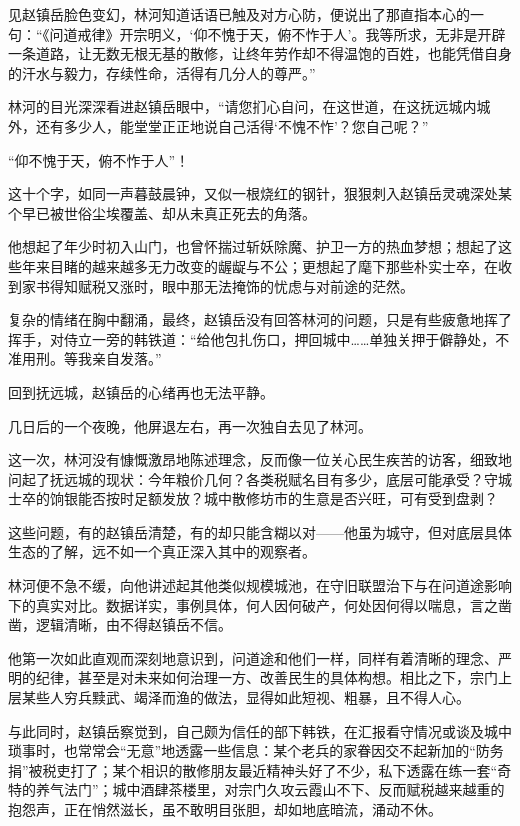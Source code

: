 见赵镇岳脸色变幻，林河知道话语已触及对方心防，便说出了那直指本心的一句：“《问道戒律》开宗明义，‘仰不愧于天，俯不怍于人’。我等所求，无非是开辟一条道路，让无数无根无基的散修，让终年劳作却不得温饱的百姓，也能凭借自身的汗水与毅力，存续性命，活得有几分人的尊严。”

林河的目光深深看进赵镇岳眼中，“请您扪心自问，在这世道，在这抚远城内城外，还有多少人，能堂堂正正地说自己活得‘不愧不怍’？您自己呢？”

“仰不愧于天，俯不怍于人”！

这十个字，如同一声暮鼓晨钟，又似一根烧红的钢针，狠狠刺入赵镇岳灵魂深处某个早已被世俗尘埃覆盖、却从未真正死去的角落。

他想起了年少时初入山门，也曾怀揣过斩妖除魔、护卫一方的热血梦想；想起了这些年来目睹的越来越多无力改变的龌龊与不公；更想起了麾下那些朴实士卒，在收到家书得知赋税又涨时，眼中那无法掩饰的忧虑与对前途的茫然。

复杂的情绪在胸中翻涌，最终，赵镇岳没有回答林河的问题，只是有些疲惫地挥了挥手，对侍立一旁的韩铁道：“给他包扎伤口，押回城中……单独关押于僻静处，不准用刑。等我亲自发落。”

回到抚远城，赵镇岳的心绪再也无法平静。

\vspace{2em}

几日后的一个夜晚，他屏退左右，再一次独自去见了林河。

这一次，林河没有慷慨激昂地陈述理念，反而像一位关心民生疾苦的访客，细致地问起了抚远城的现状：今年粮价几何？各类税赋名目有多少，底层可能承受？守城士卒的饷银能否按时足额发放？城中散修坊市的生意是否兴旺，可有受到盘剥？

这些问题，有的赵镇岳清楚，有的却只能含糊以对——他虽为城守，但对底层具体生态的了解，远不如一个真正深入其中的观察者。

林河便不急不缓，向他讲述起其他类似规模城池，在守旧联盟治下与在问道途影响下的真实对比。数据详实，事例具体，何人因何破产，何处因何得以喘息，言之凿凿，逻辑清晰，由不得赵镇岳不信。

他第一次如此直观而深刻地意识到，问道途和他们一样，同样有着清晰的理念、严明的纪律，甚至是对未来如何治理一方、改善民生的具体构想。相比之下，宗门上层某些人穷兵黩武、竭泽而渔的做法，显得如此短视、粗暴，且不得人心。

与此同时，赵镇岳察觉到，自己颇为信任的部下韩铁，在汇报看守情况或谈及城中琐事时，也常常会“无意”地透露一些信息：某个老兵的家眷因交不起新加的“防务捐”被税吏打了；某个相识的散修朋友最近精神头好了不少，私下透露在练一套“奇特的养气法门”；城中酒肆茶楼里，对宗门久攻云霞山不下、反而赋税越来越重的抱怨声，正在悄然滋长，虽不敢明目张胆，却如地底暗流，涌动不休。

